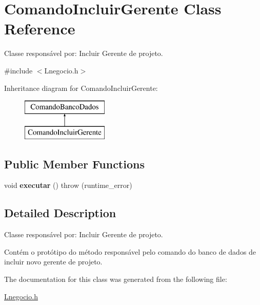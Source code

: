\hypertarget{class_comando_incluir_gerente}{}\section{Comando\+Incluir\+Gerente Class Reference}
\label{class_comando_incluir_gerente}


Classe responsável por\+: Incluir Gerente de projeto.  




{\ttfamily \#include $<$Lnegocio.\+h$>$}

Inheritance diagram for Comando\+Incluir\+Gerente\+:\begin{figure}[H]
\begin{center}
\leavevmode
\includegraphics[height=2.000000cm]{class_comando_incluir_gerente}
\end{center}
\end{figure}
\subsection*{Public Member Functions}
\begin{DoxyCompactItemize}
\item 
\hypertarget{class_comando_incluir_gerente_a5f879ccd2330c3f6ef9b9af0dee2b54e}{}\label{class_comando_incluir_gerente_a5f879ccd2330c3f6ef9b9af0dee2b54e} 
void {\bfseries executar} ()  throw (runtime\+\_\+error)
\end{DoxyCompactItemize}


\subsection{Detailed Description}
Classe responsável por\+: Incluir Gerente de projeto. 

Contém o protótipo do método responsável pelo comando do banco de dados de incluir novo gerente de projeto. 

The documentation for this class was generated from the following file\+:\begin{DoxyCompactItemize}
\item 
\hyperlink{_lnegocio_8h}{Lnegocio.\+h}\end{DoxyCompactItemize}
